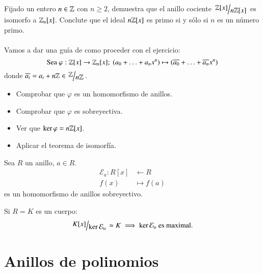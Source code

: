 \begin{ex}[H1.21]
    Fijado un entero $n \in \mathbb{Z}$ con $n \geq 2$, demuestra que el anillo cociente $\quo{\Z[x]}{n\Z[x]}$ es isomorfo a $\mathbb{Z}_n[x]$. Conclute que el ideal $n\mathbb{Z}[x]$ es primo si y sólo si $n$ es un número primo.\\\\
    Vamos a dar una guía de como proceder con el ejercicio:
    $$
        \text{Sea } \varphi: \mathbb{Z}[x] \to \mathbb{Z}_n[x];\ (a_0 + \ldots + a_n x^n) \mapsto (\overline{a_0} + \ldots + \overline{a_n} x^n)
    $$
    donde $\overline{a_i} = a_i + n\Z \in \quo{\Z}{n\Z}$.
    \begin{itemize}
        \item Comprobar que $\varphi$ es un homomorfismo de anillos.
        \item Comprobar que $\varphi$ es sobreyectiva.
        \item Ver que $\ker \varphi = n\mathbb{Z}[x]$.
        \item Aplicar el teorema de isomorfía.
    \end{itemize}
\end{ex}

\begin{eg}
    Sea $R$ un anillo, $a \in R$.
    \begin{align*}
        \mathcal{E}_a : R[x] &\longleftarrow R\\
                     f(x) &\longmapsto f(a)
    \end{align*}
    es un homomorfismo de anillos sobreyectivo.
\end{eg}

\begin{obs}
    Si $R = K$ es un cuerpo:
    $$
        \quo{K[x]}{\ker \mathcal{E}_a} \isom K \implies \ker\mathcal{E}_a \text{ es maximal.}
    $$
\end{obs}

\section{Anillos de polinomios}

